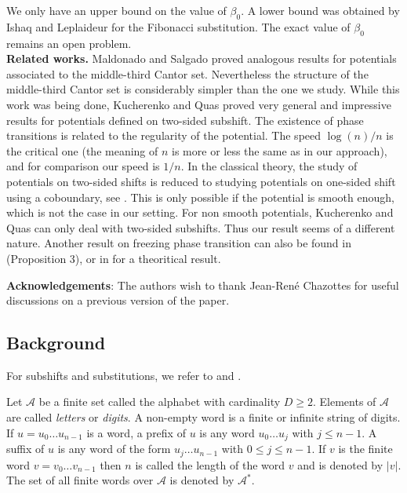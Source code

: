\documentclass[11 pt]{article}
\newcommand {\CA}{{\mathcal A}}
\theoremstyle{definition}
\begin{document}
We only have an upper bound on the value of $\beta_0$. A lower bound was obtained by Ishaq and Leplaideur  \cite{Ishaq-Leplaideur-22} for the Fibonacci substitution. The exact value of $\beta_0$ remains an open problem.  \\

{\bf Related works.} Maldonado and Salgado \cite{Maldonado-Salgado} proved analogous results for potentials associated to the middle-third Cantor set. Nevertheless the structure of the middle-third Cantor set is considerably simpler than the one we study. 
While this work was being done, Kucherenko and Quas \cite{Kucherenko-Quas-21} proved very general and impressive results for potentials defined on  two-sided subshift. The existence of phase transitions is related to the regularity of the potential. The speed $\log(n)/n$ is the critical one (the meaning of $n$ is more or less the same as in our approach), and for comparison our speed is $1/n$. In the classical theory, the study of potentials on two-sided shifts is reduced to studying potentials on one-sided shift using a coboundary, see \cite{Walters.75}. This is only possible if the potential is smooth enough, which is not the case in our setting. For non smooth potentials, Kucherenko and Quas can only deal with two-sided subshifts. Thus our result seems of a different nature.
Another result on freezing phase transition can also be found in \cite{Kucherenko-Thompson-20} (Proposition 3), or in \cite{BKL-23} for a theoritical result.


{\bf Acknowledgements}: The authors wish to thank Jean-René Chazottes for useful discussions on a previous version of the paper.


\subsection{Background}
For subshifts and substitutions, we refer to \cite{Durand-Perrin-22} and \cite{Queffelec}.

Let $\mathcal{A}$ be a finite set called the alphabet with cardinality $D\ge 2$. Elements of $\CA$ are called \emph{letters} or \emph{digits}.
A non-empty word is a finite  or infinite string of digits. If $u=u_{0}\ldots u_{n-1}$ is a word, a prefix of $u$ is any word $u_{0}\ldots u_{j}$ with $j\le n-1$. A suffix of $u$ is any word of the form $u_{j}\ldots u_{n-1}$ with $0\le j\le n-1$.  
If $v$ is the  finite word $v=v_0\dots v_{n-1}$ then $n$ is called the length of the word $v$ and is denoted by $|v|$. The set of all finite words over $\mathcal{A}$ is denoted by $\mathcal{A}^*$. 
\end{document}

